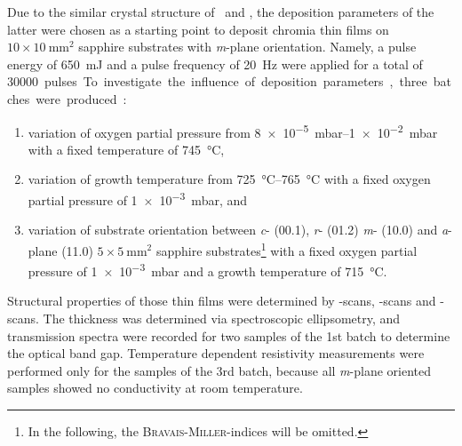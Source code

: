 Due to the similar crystal structure of \cro\ and \agao, the deposition parameters of the latter were chosen as a starting point to deposit chromia thin films on $10\times\qty{10}{\mm\squared}$ sapphire substrates with \textit{m}-plane orientation.
Namely, a pulse energy of \qty{650}{mJ} and a pulse frequency of \qty{20}{\Hz} were applied for a total of \qty{30000} pulses.
To investigate the influence of deposition parameters, three batches were produced:
\begin{enumerate}
    \item variation of oxygen partial pressure from \qtyrange{8e-5}{1e-2}{mbar} with a fixed temperature of \qty{745}{\degreeCelsius},
    \item variation of growth temperature from \qtyrange{725}{765}{\degreeCelsius} with a fixed oxygen partial pressure of \qty{1e-3}{mbar}, and
    \item variation of substrate orientation between \textit{c}- (00.1), \textit{r}- (01.2) \textit{m}- (10.0) and \textit{a}-plane (11.0) $5\times\qty{5}{\mm\squared}$ sapphire substrates\footnote{
        In the following, the \textsc{Bravais}-\textsc{Miller}-indices will be omitted.
        }
    with a fixed oxygen partial pressure of \qty{1e-3}{mbar} and a growth temperature of \qty{715}{\degreeCelsius}.
\end{enumerate}
Structural properties of those thin films were determined by \thetaomega-scans, \textomega-scans and \textphi-scans.
The thickness was determined via spectroscopic ellipsometry, and transmission spectra were recorded for two samples of the 1st batch to determine the optical band gap.
Temperature dependent resistivity measurements were performed only for the samples of the 3rd batch, because all \textit{m}-plane oriented samples showed no conductivity at room temperature.